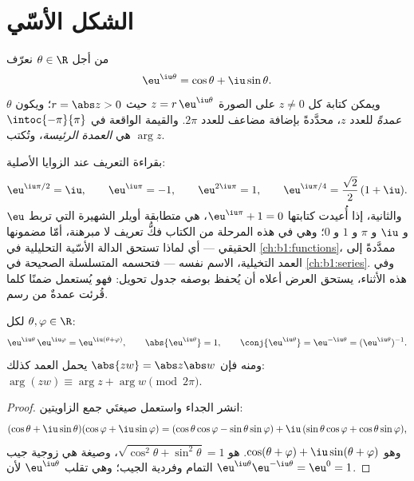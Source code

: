 \section{الشكل الأسّي}

\begin{definition}\label{def:b1:complex:expi}
من أجل $\theta \in \R$ نعرّف
\[
\eu^{\iu\theta} = \cos\theta + \iu \sin\theta .
\]
ويمكن كتابة كل $z \neq 0$ على الصورة $z = r\,\eu^{\iu\theta}$ حيث $r =
\abs z > 0$؛ ويكون $\theta$ \emph{عمدةً} للعدد $z$،
محدَّدةً بإضافة مضاعف للعدد $2\pi$. والقيمة الواقعة في
$\intoc{-\pi}{\pi}$ هي \emph{العمدة الرئيسة}، وتُكتب
$\arg z$.
\end{definition}

\begin{example}\label{ex:b1:complex:eulerid}
بقراءة التعريف عند الزوايا الأصلية:
\[
\eu^{\iu\pi/2} = \iu, \qquad
\eu^{\iu\pi} = -1, \qquad
\eu^{2\iu\pi} = 1, \qquad
\eu^{\iu\pi/4} = \frac{\sqrt2}2\,(1 + \iu) .
\]
والثانية، إذا أُعيدت كتابتها $\eu^{\iu\pi} + 1 = 0$، هي متطابقة
أويلر الشهيرة التي تربط $\eu$ و $\iu$ و $\pi$ و $1$ و $0$؛ وهي في
هذه المرحلة من الكتاب فكُّ تعريف لا مبرهنة، أمّا مضمونها الحقيقي
--- أي لماذا تستحق الدالة الأسّية التحليلية في
\cref{ch:b1:functions}، ممدَّدةً إلى العمد التخيلية، الاسم نفسه ---
فتحسمه المتسلسلة الصحيحة في \cref{ch:b1:series}. وفي هذه
الأثناء، يستحق العرض أعلاه أن يُحفظ بوصفه جدول تحويل: فهو
يُستعمل ضمنًا كلما قُرئت عمدةٌ من رسم.
\end{example}

\begin{theorem}\label{thm:b1:complex:funceq}
لكل $\theta, \varphi \in \R$:
\[
\eu^{\iu\theta}\, \eu^{\iu\varphi} = \eu^{\iu(\theta + \varphi)},
\qquad
\abs{\eu^{\iu\theta}} = 1,
\qquad
\conj{\eu^{\iu\theta}} = \eu^{-\iu\theta} = (\eu^{\iu\theta})^{-1}.
\]
ومنه فإن $\abs{zw} = \abs z \abs w$ يحمل العمد كذلك:
$\arg(zw) \equiv \arg z + \arg w \pmod{2\pi}$.
\end{theorem}

\begin{proof}
انشر الجداء واستعمل صيغتَي جمع الزاويتين:
\[
(\cos\theta + \iu\sin\theta)(\cos\varphi + \iu\sin\varphi)
= (\cos\theta\cos\varphi - \sin\theta\sin\varphi)
+ \iu\,(\sin\theta\cos\varphi + \cos\theta\sin\varphi),
\]
وهو $\cos(\theta+\varphi) + \iu\sin(\theta+\varphi)$. 
هو $\sqrt{\cos^2\theta + \sin^2\theta} = 1$، وصيغة  هي
زوجية جيب التمام وفردية الجيب؛ وهي تقلب $\eu^{\iu\theta}$ لأن
$\eu^{\iu\theta}\eu^{-\iu\theta} = \eu^0 = 1$.
\end{proof}

